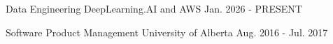 
\begin{cventries}


  \cventry
    {}
    {Data Engineering}
    {DeepLearning.AI and AWS}
    {Jan. 2026 - PRESENT}
    {}



  \cventry
    {}
    {Software Product Management}
    {University of Alberta}
    {Aug. 2016 - Jul. 2017}
    {}



\end{cventries}
